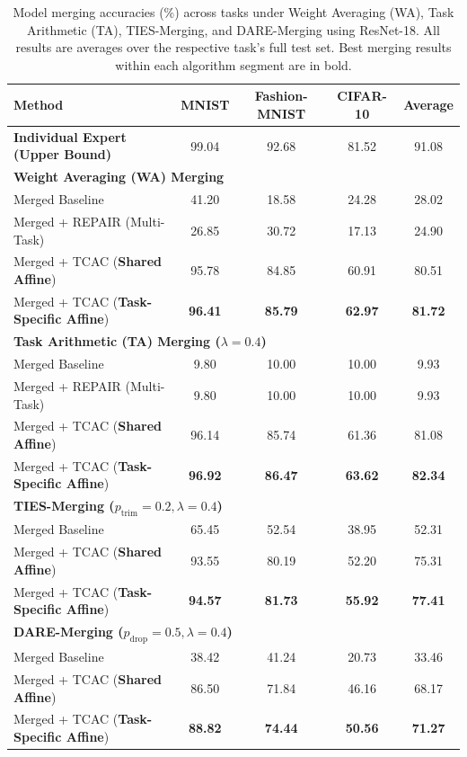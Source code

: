 \documentclass{article}
\theoremstyle{plain}
\theoremstyle{definition}
\theoremstyle{remark}
\begin{document}
\begin{table}[t]
\centering
\caption{Model merging accuracies (\%) across tasks under Weight Averaging (WA), Task Arithmetic (TA), TIES-Merging, and DARE-Merging using ResNet-18. All results are averages over the respective task's full test set. Best merging results within each algorithm segment are in bold.}
\label{tab:main_results}
\begin{tabular}{lcccc}
\toprule
\textbf{Method} & \textbf{MNIST} & \textbf{Fashion-MNIST} & \textbf{CIFAR-10} & \textbf{Average} \\
\midrule
\textbf{Individual Expert (Upper Bound)} & 99.04 & 92.68 & 81.52 & 91.08 \\
\midrule
\multicolumn{5}{l}{\textbf{Weight Averaging (WA) Merging}} \\
\midrule
Merged Baseline & 41.20 & 18.58 & 24.28 & 28.02 \\
Merged + REPAIR (Multi-Task) \cite{jordan2022repair} & 26.85 & 30.72 & 17.13 & 24.90 \\
Merged + TCAC (\textbf{Shared Affine}) & 95.78 & 84.85 & 60.91 & 80.51 \\
Merged + TCAC (\textbf{Task-Specific Affine}) & \textbf{96.41} & \textbf{85.79} & \textbf{62.97} & \textbf{81.72} \\
\midrule
\multicolumn{5}{l}{\textbf{Task Arithmetic (TA) Merging ($\lambda = 0.4$)}} \\
\midrule
Merged Baseline & 9.80 & 10.00 & 10.00 & 9.93 \\
Merged + REPAIR (Multi-Task) \cite{jordan2022repair} & 9.80 & 10.00 & 10.00 & 9.93 \\
Merged + TCAC (\textbf{Shared Affine}) & 96.14 & 85.74 & 61.36 & 81.08 \\
Merged + TCAC (\textbf{Task-Specific Affine}) & \textbf{96.92} & \textbf{86.47} & \textbf{63.62} & \textbf{82.34} \\
\midrule
\multicolumn{5}{l}{\textbf{TIES-Merging ($p_{\text{trim}} = 0.2, \lambda = 0.4$) \cite{yadav2023ties}}} \\
\midrule
Merged Baseline & 65.45 & 52.54 & 38.95 & 52.31 \\
Merged + TCAC (\textbf{Shared Affine}) & 93.55 & 80.19 & 52.20 & 75.31 \\
Merged + TCAC (\textbf{Task-Specific Affine}) & \textbf{94.57} & \textbf{81.73} & \textbf{55.92} & \textbf{77.41} \\
\midrule
\multicolumn{5}{l}{\textbf{DARE-Merging ($p_{\text{drop}} = 0.5, \lambda = 0.4$) \cite{yu2024dare}}} \\
\midrule
Merged Baseline & 38.42 & 41.24 & 20.73 & 33.46 \\
Merged + TCAC (\textbf{Shared Affine}) & 86.50 & 71.84 & 46.16 & 68.17 \\
Merged + TCAC (\textbf{Task-Specific Affine}) & \textbf{88.82} & \textbf{74.44} & \textbf{50.56} & \textbf{71.27} \\
\bottomrule
\end{tabular}
\end{table}
\end{document}
